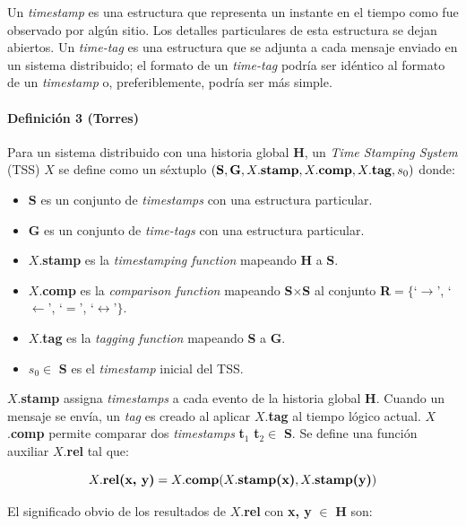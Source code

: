 \documentclass[12pt, times]{simauth}
\begin{document}
Un \emph{timestamp} es una estructura que representa un instante en el tiempo como fue observado por algún sitio. Los detalles particulares de esta estructura se dejan abiertos. Un \emph{time-tag} es una estructura que se adjunta a cada mensaje enviado en un sistema distribuido; el formato de un \emph{time-tag} podría ser idéntico al formato de un \emph{timestamp} o, preferiblemente, podría ser más simple. 

\paragraph{Definición 3 (Torres)} Para un sistema distribuido con una historia global \textbf{H}, un \emph{Time Stamping System} (TSS) $X$ se define como un séxtuplo $(\text{\textbf{S}}, \text{\textbf{G}}, X.\text{\textbf{stamp}}, X.\text{\textbf{comp}}, X.\text{\textbf{tag}}, s_0)$ donde:
\begin{itemize}
    \item[] \textbf{S} es un conjunto de \emph{timestamps} con una estructura particular.
    \item[] \textbf{G} es un conjunto de \emph{time-tags} con una estructura particular.
    \item[] $X$.\textbf{stamp} es la \emph{timestamping function} mapeando \textbf{H} a \textbf{S}.
    \item[] $X$.\textbf{comp} es la \emph{comparison function} mapeando \textbf{S}$\times$\textbf{S} al conjunto \textbf{R}$= \{$\textquoteleft$\to$\textquoteright,  \textquoteleft$\leftarrow$\textquoteright, \textquoteleft$=$\textquoteright, \textquoteleft$\leftrightarrow$\textquoteright$\}$.
    \item[] $X$.\textbf{tag} es la \emph{tagging function} mapeando \textbf{S} a \textbf{G}.
    \item[] $s_0 \in$ \textbf{S} es el \emph{timestamp} inicial del TSS.   
\end{itemize}

$X$.\textbf{stamp} assigna \emph{timestamps} a cada evento de la historia global \textbf{H}. Cuando un mensaje se envía, un \emph{tag} es creado al aplicar $X$.\textbf{tag} al tiempo lógico actual. $X$.\textbf{comp} permite comparar dos \emph{timestamps} \textbf{t}$_1$ \textbf{t}$_2 \in$ \textbf{S}. Se define una función auxiliar $X$.\textbf{rel} tal que:

$$X.\text{\textbf{rel(x, y)}} = X.\text{\textbf{comp}}(X.\text{\textbf{stamp(x)}}, X.\text{\textbf{stamp(y)}})$$

El significado obvio de los resultados de $X$.\textbf{rel} con \textbf{x, y} $\in$ \textbf{H} son:
\end{document}

